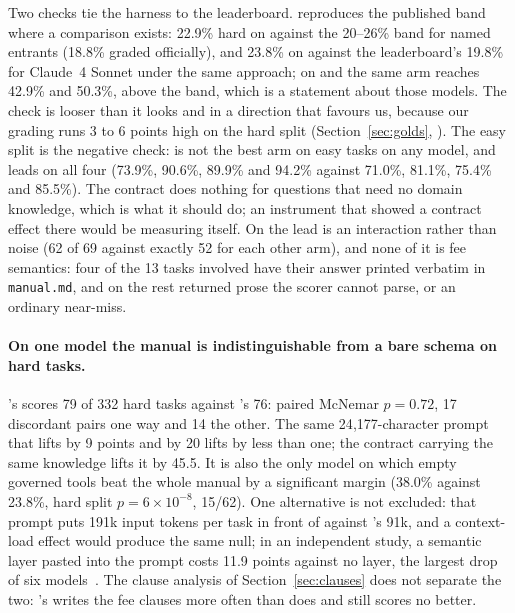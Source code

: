 Two checks tie the harness to the leaderboard. \armM{} reproduces the
published band where a comparison exists: 22.9\% hard on \mGLM{} against
the 20--26\% band for named entrants (18.8\% graded officially), and 23.8\%
on \mSON{} against the leaderboard's 19.8\% for Claude~4 Sonnet under the
same approach; on \mDS{} and \mGPT{} the same arm reaches 42.9\% and
50.3\%, above the band, which is a statement about those models. The check
is looser than it looks and in a direction that favours us, because our
grading runs 3 to 6 points high on the hard split (Section~\ref{sec:golds},
). The easy split is the negative check: \armC{} is not
the best arm on easy tasks on any model, and \armM{} leads on all four
(73.9\%, 90.6\%, 89.9\% and 94.2\% against 71.0\%, 81.1\%, 75.4\% and
85.5\%). The contract does nothing for questions that need no domain
knowledge, which is what it should do; an instrument that showed a contract
effect there would be measuring itself. On \mSON{} the lead is an
interaction rather than noise (62 of 69 against exactly 52 for each other
arm), and none of it is fee semantics: four of the 13 tasks involved have
their answer printed verbatim in \texttt{manual.md}, and on the rest \armC{}
returned prose the scorer cannot parse, or an ordinary near-miss.

\paragraph{On one model the manual is indistinguishable from a bare schema
on hard tasks.} \mSON{}'s \armM{} scores 79 of 332 hard tasks against
\armS{}'s 76: paired McNemar $p{=}0.72$, 17 discordant pairs one way and 14
the other. The same 24{,}177-character prompt that lifts \mGLM{} by 9 points
and \mDS{} by 20 lifts \mSON{} by less than one; the contract carrying the
same knowledge lifts it by 45.5. It is also the only model on which empty
governed tools beat the whole manual by a significant margin (38.0\%
against 23.8\%, hard split $p{=}6{\times}10^{-8}$, 15/62). One alternative is not excluded: that prompt
puts 191k input tokens per task in front of \mSON{} against \armS{}'s 91k,
and a context-load effect would produce the same null; in an independent
study, a semantic layer pasted into the prompt costs \mSON{} 11.9 points
against no layer, the largest drop of six models~\cite{evoontology}. The
clause analysis of Section~\ref{sec:clauses} does not separate the two:
\mSON{}'s \armM{} writes the fee clauses more often than \armS{} does and
still scores no better.

